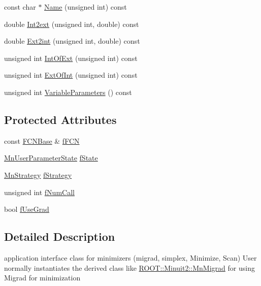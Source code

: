\begin{DoxyCompactItemize}
\item 
const char $\ast$ \mbox{\hyperlink{classROOT_1_1Minuit2_1_1MnApplication_af970f4c896be2d56b2bfb33a8e6e33c9}{Name}} (unsigned int) const
\item 
double \mbox{\hyperlink{classROOT_1_1Minuit2_1_1MnApplication_a1ca8337823e271c40f05f6da6ea8e231}{Int2ext}} (unsigned int, double) const
\item 
double \mbox{\hyperlink{classROOT_1_1Minuit2_1_1MnApplication_a8c9379939f201ea95f32a2f1de575fca}{Ext2int}} (unsigned int, double) const
\item 
unsigned int \mbox{\hyperlink{classROOT_1_1Minuit2_1_1MnApplication_a7911389abce948da10dd82a8a172afd5}{Int\+Of\+Ext}} (unsigned int) const
\item 
unsigned int \mbox{\hyperlink{classROOT_1_1Minuit2_1_1MnApplication_a61dc63d2a6320aae96867ad57918c496}{Ext\+Of\+Int}} (unsigned int) const
\item 
unsigned int \mbox{\hyperlink{classROOT_1_1Minuit2_1_1MnApplication_afc0ad887758b1609cbcae1c8b6a5a467}{Variable\+Parameters}} () const
\end{DoxyCompactItemize}
\subsection*{Protected Attributes}
\begin{DoxyCompactItemize}
\item 
const \mbox{\hyperlink{classROOT_1_1Minuit2_1_1FCNBase}{F\+C\+N\+Base}} \& \mbox{\hyperlink{classROOT_1_1Minuit2_1_1MnApplication_a3ea713844ff160f58da7e7d7897769fa}{f\+F\+CN}}
\item 
\mbox{\hyperlink{classROOT_1_1Minuit2_1_1MnUserParameterState}{Mn\+User\+Parameter\+State}} \mbox{\hyperlink{classROOT_1_1Minuit2_1_1MnApplication_a1bc33d1202bbcdfe3e757ff73f0b590e}{f\+State}}
\item 
\mbox{\hyperlink{classROOT_1_1Minuit2_1_1MnStrategy}{Mn\+Strategy}} \mbox{\hyperlink{classROOT_1_1Minuit2_1_1MnApplication_aac420948b2066e56f50db12e165ef60b}{f\+Strategy}}
\item 
unsigned int \mbox{\hyperlink{classROOT_1_1Minuit2_1_1MnApplication_ae28c000d63a6400d78fa6372ff4d7f13}{f\+Num\+Call}}
\item 
bool \mbox{\hyperlink{classROOT_1_1Minuit2_1_1MnApplication_ad9e1b4134667cb727d8344be83bf4ab7}{f\+Use\+Grad}}
\end{DoxyCompactItemize}


\subsection{Detailed Description}
application interface class for minimizers (migrad, simplex, Minimize, Scan) User normally instantiates the derived class like \mbox{\hyperlink{classROOT_1_1Minuit2_1_1MnMigrad}{R\+O\+O\+T\+::\+Minuit2\+::\+Mn\+Migrad}} for using Migrad for minimization 

